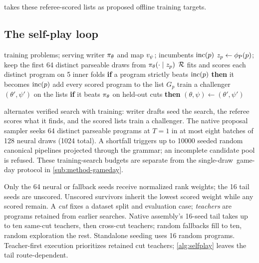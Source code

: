  takes these referee-scored lists as proposed
offline \mbox{training} targets.

\subsection{The self-play loop}\label{sub:method-selfplay}
\begin{algorithm*}[t]
\caption{\textbf{The reference self-play loop (training).}}\label{alg:selfplay}
\begin{algorithmic}[1]
\Require training problems; serving writer $\pi_{\theta}$ and map $v_{\psi}$; incumbents $\mathrm{inc}(p)$
    \State $z_p \gets \phi_{\mathrm{P}}(p)$; keep the first 64 distinct parseable draws from $\pi_{\theta}(\cdot\mid z_p)$ 
    \State $\mathcal{R}$ fits and scores each distinct program on 5 inner folds 
    \State \textbf{if} a program strictly beats $\mathrm{inc}(p)$ \textbf{then} it becomes $\mathrm{inc}(p)$ 
    \State add every scored program to the list $G_p$ 
  \EndFor
  \State train a challenger $(\theta',\psi')$ on the lists
  \State \textbf{if} it beats $\pi_{\theta}$ on held-out cuts \textbf{then} $(\theta,\psi)\gets(\theta',\psi')$ 
\EndFor
\end{algorithmic}
\end{algorithm*}

 alternates verified search with training: writer
drafts seed the search, the referee scores what it finds, and the scored
lists train a challenger.
The native proposal sampler seeks 64 distinct parseable programs at $T=1$
in at most eight batches of 128 neural draws (\num{1024} total). A shortfall
triggers up to \num{10000} seeded random canonical pipelines projected
through the grammar; an incomplete candidate pool is refused. These
training-search budgets are separate from the \mbox{single-draw game-day}
protocol in \cref{sub:method-gameday}.

Only the 64 neural or fallback seeds receive normalized rank weights;
the 16 tail seeds are unscored. Unscored survivors inherit the lowest
scored weight while any scored remain.
A \emph{cut} fixes a dataset split and evaluation case; \emph{teachers} are programs retained from earlier searches. Native assembly's 16-seed
tail takes up to ten same-cut teachers, then cross-cut teachers; random
fallbacks fill to ten, random exploration the rest. Standalone seeding uses
16 random programs. Teacher-first execution prioritizes retained cut teachers;
\cref{alg:selfplay} leaves the tail route-dependent.

